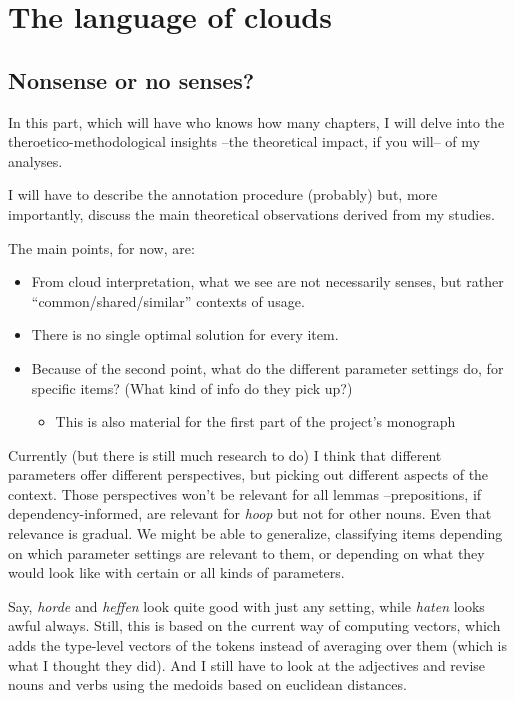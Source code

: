 \documentclass[
]{book}
\providecommand{\tightlist}{%
  \setlength{\itemsep}{0pt}\setlength{\parskip}{0pt}}
\begin{document}
\hypertarget{part-the-language-of-clouds}{%
\part{The language of clouds}\label{part-the-language-of-clouds}}

\hypertarget{nonsense-or-no-senses}{%
\chapter{Nonsense or no senses?}\label{nonsense-or-no-senses}}

In this part, which will have who knows how many chapters, I will delve into the
theroetico-methodological insights --the theoretical impact, if you will-- of
my analyses.

I will have to describe the annotation procedure (probably) but, more importantly,
discuss the main theoretical observations derived from my studies.

The main points, for now, are:

\begin{itemize}
\item
  From cloud interpretation, what we see are not necessarily senses, but rather
  ``common/shared/similar'' contexts of usage.
\item
  There is no single optimal solution for every item.
\item
  Because of the second point, what do the different parameter settings do,
  for specific items? (What kind of info do they pick up?)

  \begin{itemize}
  \tightlist
  \item
    This is also material for the first part of the project's monograph
  \end{itemize}
\end{itemize}

Currently (but there is still much research to do) I think that
different parameters offer different perspectives, but picking out different aspects
of the context.
Those perspectives won't be relevant for all lemmas --prepositions, if dependency-informed,
are relevant for \emph{hoop} but not for other nouns. Even that relevance is gradual.
We might be able to generalize, classifying items depending on which parameter settings
are relevant to them, or depending on what they would look like with certain or all kinds
of parameters.

Say, \emph{horde} and \emph{heffen} look quite good with just any setting, while \emph{haten} looks awful always.
Still, this is based on the current way of computing vectors,
which adds the type-level vectors of the tokens instead of averaging over them
(which is what I thought they did).
And I still have to look at the adjectives and revise nouns and verbs using the medoids based on
euclidean distances.
\end{document}
